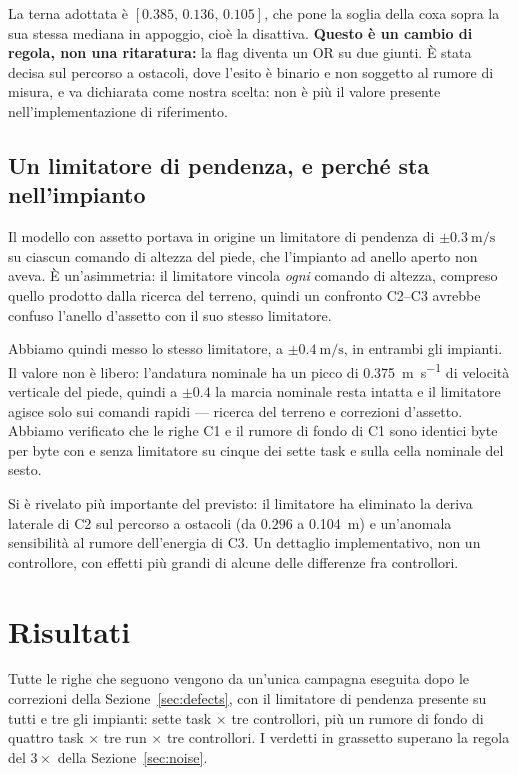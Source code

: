 \documentclass[11pt,a4paper]{article}
\newcommand{\Co}{\textsf{C1}}
\newcommand{\Ct}{\textsf{C2}}
\newcommand{\Cth}{\textsf{C3}}
\begin{document}
La terna adottata \`e $[0.385,\,0.136,\,0.105]$, che pone la soglia della coxa
sopra la sua stessa mediana in appoggio, cio\`e la disattiva. \textbf{Questo \`e
un cambio di regola, non una ritaratura:} la flag diventa un OR su due giunti.
\`E stata decisa sul percorso a ostacoli, dove l'esito \`e binario e non soggetto
al rumore di misura, e va dichiarata come nostra scelta: non \`e pi\`u il valore
presente nell'implementazione di riferimento.

\subsection{Un limitatore di pendenza, e perch\'e sta nell'impianto}
\label{sec:slew}

Il modello con assetto portava in origine un limitatore di pendenza di
$\pm\SI{0.3}{\meter\per\second}$ su ciascun comando di altezza del piede, che
l'impianto ad anello aperto non aveva. \`E un'asimmetria: il limitatore vincola
\emph{ogni} comando di altezza, compreso quello prodotto dalla ricerca del
terreno, quindi un confronto \Ct{}--\Cth{} avrebbe confuso l'anello d'assetto
con il suo stesso limitatore.

Abbiamo quindi messo lo stesso limitatore, a
$\pm\SI{0.4}{\meter\per\second}$, in entrambi gli impianti. Il valore non \`e
libero: l'andatura nominale ha un picco di \SI{0.375}{\meter\per\second} di
velocit\`a verticale del piede, quindi a $\pm0.4$ la marcia nominale resta
intatta e il limitatore agisce solo sui comandi rapidi --- ricerca del terreno e
correzioni d'assetto. Abbiamo verificato che le righe \Co{} e il rumore di
fondo di \Co{} sono identici byte per byte con e senza limitatore su cinque dei
sette task e sulla cella nominale del sesto.

Si \`e rivelato pi\`u importante del previsto: il limitatore ha eliminato la
deriva laterale di \Ct{} sul percorso a ostacoli (da $0.296$ a
\SI{0.104}{\meter}) e un'anomala sensibilit\`a al rumore dell'energia di \Cth{}.
Un dettaglio implementativo, non un controllore, con effetti pi\`u grandi di
alcune delle differenze fra controllori.

\section{Risultati}
\label{sec:results}

Tutte le righe che seguono vengono da un'unica campagna eseguita dopo le
correzioni della Sezione~\ref{sec:defects}, con il limitatore di pendenza
presente su tutti e tre gli impianti: sette task $\times$ tre controllori, pi\`u
un rumore di fondo di quattro task $\times$ tre run $\times$ tre controllori. I
verdetti in grassetto superano la regola del $3\times$ della
Sezione~\ref{sec:noise}.
\end{document}
